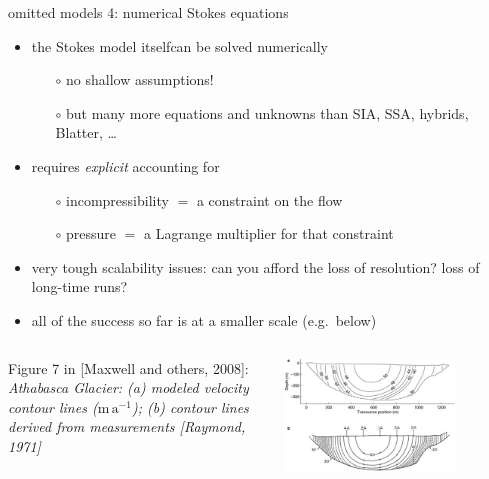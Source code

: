 \begin{frame}{omitted models 4: numerical Stokes equations}

\begin{itemize}
\item the Stokes model itselfcan be solved numerically
  \begin{itemize}
  \item[$\circ$] no shallow assumptions!
  \item[$\circ$] but many more equations and unknowns than SIA, SSA, hybrids, Blatter, \dots
  \end{itemize}
\item requires \emph{explicit} accounting for
  \begin{itemize}
  \item[$\circ$] incompressibility $=$ a constraint on the flow
  \item[$\circ$] pressure $=$ a Lagrange multiplier for that constraint
  \end{itemize} 
\item very tough scalability issues:  can you afford the loss of resolution?  loss of long-time runs?
\item all of the success so far is at a smaller scale (e.g.~below)
\end{itemize}

\begin{columns}
\begin{column}{0.45\textwidth}
\scriptsize
Figure 7 in [Maxwell and others, 2008]\nocite{Maxwelletal2008}: \emph{Athabasca Glacier:  (a) modeled velocity contour lines ($\text{m}\,\text{a}^{-1}$); (b) contour lines derived from measurements [Raymond, 1971]\nocite{Raymond1971}}
\end{column}
\begin{column}{0.6\textwidth}
\includegraphics[width=0.75\textwidth]{photos/athabasca_cross}
\end{column}
\end{columns}
\end{frame}


